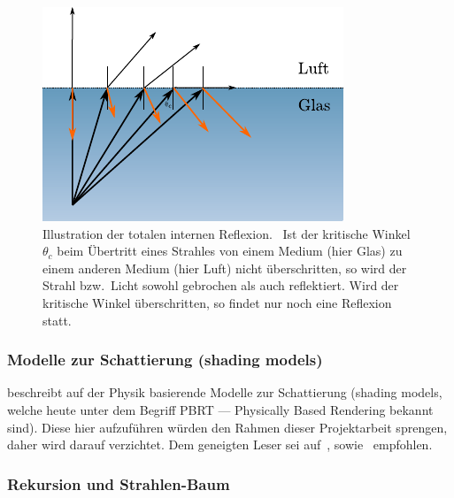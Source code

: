 \begin{figure}[H]\label{fig:ray_tracing_total_internal_reflection}
    \centering
    \includegraphics{img/total_internal_reflection.pdf}
    \caption{Illustration der totalen internen
        Reflexion.~\protect\footnotemark{}
        Ist der kritische Winkel $\theta_{c}$ beim Übertritt eines
        Strahles von einem Medium (hier Glas) zu einem anderen Medium (hier
        Luft) nicht überschritten, so wird der Strahl bzw.\ Licht sowohl
        gebrochen als auch reflektiert. Wird der kritische Winkel
        überschritten, so findet nur noch eine Reflexion
        statt.\protect\footnotemark}
\end{figure}
\addtocounter{footnote}{-2}

\subsubsection{Modelle zur Schattierung (shading models)}
\label{ssubsec:ray_tracing:shading_models}

\citeauthor{glassner_introduction_1989} beschreibt auf der Physik
basierende Modelle zur Schattierung (shading models, welche heute unter
dem Begriff PBRT --- Physically Based Rendering bekannt sind). Diese
hier aufzuführen würden den Rahmen dieser Projektarbeit sprengen, daher
wird darauf verzichtet. Dem geneigten Leser sei
auf~,
sowie~ empfohlen.

\subsubsection{Rekursion und Strahlen-Baum}
\label{ssubsec:ray_tracing:recursion}

